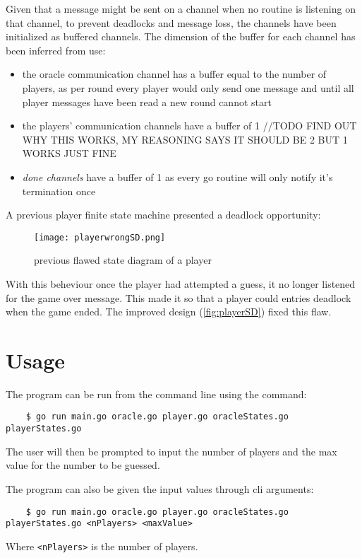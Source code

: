 \documentclass[12pt, a4paper]{report}
\begin{document}
Given that a message might be sent on a channel when no routine is listening on that channel, to prevent deadlocks and message loss, the channels have
 been initialized as buffered channels.
The dimension of the buffer for each channel has been inferred from use:
\begin{itemize}
    \item the oracle communication channel has a buffer equal to the number of players, as per round every player would only send one message and 
 until all player messages have been read a new round cannot start
    \item the players' communication channels have a buffer of 1 //TODO FIND OUT WHY THIS WORKS, MY REASONING SAYS IT SHOULD BE 2 BUT 1 WORKS JUST FINE
    \item \emph{done channels} have a buffer of 1 as every go routine will only notify it's termination once
\end{itemize}


A previous player finite state machine presented a deadlock opportunity:

\begin{figure}
    \centering
    \texttt{[image: playerwrongSD.png]}
    \caption{previous flawed state diagram of a player}
    \label{fig:playerwrongSD}
\end{figure}

With this beheviour once the player had attempted a guess, it no longer listened for the game over message. This made it so that a player could entries
 deadlock when the game ended. The improved design (\ref{fig:playerSD}) fixed this flaw.

\chapter{Usage}
The program can be run from the command line using the command:
\begin{lstlisting}
    $ go run main.go oracle.go player.go oracleStates.go playerStates.go
\end{lstlisting}
The user will then be prompted to input the number of players and the max value for the number to be guessed.

The program can also be given the input values through cli arguments:
\begin{lstlisting}
    $ go run main.go oracle.go player.go oracleStates.go playerStates.go <nPlayers> <maxValue>
\end{lstlisting}
Where \verb|<nPlayers>| is the number of players.
\end{document}
